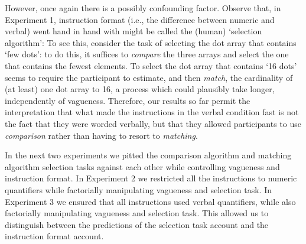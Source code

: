 However, once again there is a possibly confounding factor. Observe that, in Experiment 1, instruction format (i.e., the difference between numeric and verbal) went hand in hand with might be called the (human) `selection algorithm': To see this, consider the task of selecting the dot array that contains `few dots': to do this, it suffices to \emph{compare} the three arrays and select the one that contains the fewest elements.  To select the dot array that contains `16 dots' seems to require the participant to estimate, and then \emph{match}, the cardinality of (at least) one dot array to 16, a process which could plausibly take longer, independently of vagueness. Therefore, our results so far permit the interpretation that what made the instructions in the verbal condition fast is not the fact that they were worded verbally, but that they allowed participants to use \emph{comparison} rather than having to resort to \emph{matching}.

In the next two experiments we pitted the comparison algorithm and matching algorithm selection tasks against each other while controlling vagueness and instruction format. In Experiment 2 we restricted all the instructions to numeric quantifiers while factorially manipulating vagueness and selection task. In Experiment 3 we ensured that all instructions used verbal quantifiers, while also factorially manipulating vagueness and selection task. This allowed us to distinguish between the predictions of the selection task account and the instruction format account. 

